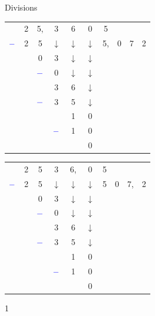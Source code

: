 \documentclass[a4paper,11pt]{report}
\begin{document}
\begin{resolu}{Divisions}
{\bigskip

\bigskip

\begin{minipage}{0,45\linewidth}
{{{\color{blue}
\begin{tabular}{cccccc|cccc}
&2 &5, &3 &6 & 0 &  5 & & & \\\cline{7-10}
${\color{blue}-}$ & 2 & 5 &$\downarrow$ &$\downarrow$ &$\downarrow$ &5, &0 & 7 & 2 \\\cline{1-3}
& &0 &3 &$\downarrow$ &$\downarrow$  & & & & \\
& & ${\color{blue}-}$ & 0 & $\downarrow$ & $\downarrow$  & & & & \\\cline{3-4}
& & &3 &6 & $\downarrow$  & & & & \\
& & ${\color{blue}-}$ &3 & 5 &$\downarrow$  & & & & \\\cline{3-5}
& & & & 1 & 0  & & & & \\
& & & ${\color{blue}-}$& 1 & 0  & & & & \\\cline{4-6}
& & & & & 0  & & & & \\
\end{tabular}
}}}
\end{minipage} \hfill
\begin{minipage}{0,45\linewidth}
{{{\color{blue}
\begin{tabular}{cccccc|cccc}
&2 &5 &3 &6, & 0  & 5 & & & \\\cline{7-10}
${\color{blue}-}$ & 2 & 5 &$\downarrow$ &$\downarrow$ &$\downarrow$ &5 &0 & 7, & 2 \\\cline{1-3}
& &0 &3 &$\downarrow$ &$\downarrow$  & & & & \\
& & ${\color{blue}-}$ & 0 & $\downarrow$ & $\downarrow$  & & & & \\\cline{3-4}
& & &3 &6 & $\downarrow$  & & & & \\
& & ${\color{blue}-}$ &3 & 5 &$\downarrow$  & & & & \\\cline{3-5}
& & & & 1 & 0  & & & & \\
& & & ${\color{blue}-}$& 1 & 0 & & & & \\\cline{4-6}
& & & & & 0  & & & & \\
\end{tabular}
}}}
\end{minipage}

}{1}
\end{resolu}
\end{document}
